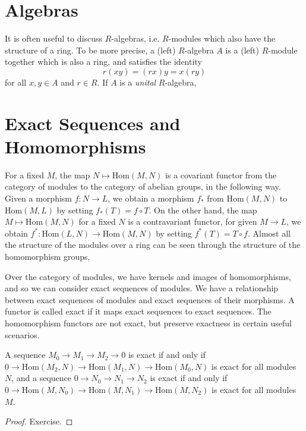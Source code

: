 \section{Algebras}

It is often useful to discuss $R$-algebras, i.e. $R$-modules which also have the structure of a ring. To be more precise, a (left) $R$-algebra $A$ is a (left) $R$-module together which is also a ring, and satisfies the identity
%
\[ r(xy) = (rx) y = x(ry) \]
%
for all $x,y \in A$ and $r \in R$. If $A$ is a \emph{unital} $R$-algebra, 

\section{Exact Sequences and Homomorphisms}

For a fixed $M$, the map $N \mapsto \text{Hom}(M,N)$ is a covariant functor from the category of modules to the category of abelian groups, in the following way. Given a morphism $f: N \to L$, we obtain a morphism $f_*$ from $\text{Hom}(M,N)$ to $\text{Hom}(M,L)$ by setting $f_*(T) = f \circ T$. On the other hand, the map $M \mapsto \text{Hom}(M,N)$ for a fixed $N$ is a contravariant functor, for given $M \to L$, we obtain $f^*: \text{Hom}(L,N) \to \text{Hom}(M,N)$ by setting $f^*(T) = T \circ f$. Almost all the structure of the modules over a ring can be seen through the structure of the homomorphism groups, 

Over the category of modules, we have kernels and images of homomorphisms, and so we can consider exact sequences of modules. We have a relationship between exact sequences of modules and exact sequences of their morphisms. A functor is called exact if it maps exact sequences to exact sequences. The homomorphism functors are not exact, but preserve exactness in certain useful scenarios.

\begin{theorem}
    A sequence $M_0 \to M_1 \to M_2 \to 0$ is exact if and only if $0 \to \text{Hom}(M_2,N) \to \text{Hom}(M_1,N) \to \text{Hom}(M_0,N)$ is exact for all modules $N$, and a sequence $0 \to N_0 \to N_1 \to N_2$ is exact if and only if $0 \to \text{Hom}(M,N_0) \to \text{Hom}(M,N_1) \to \text{Hom}(M,N_2)$ is exact for all modules $M$.
\end{theorem}
\begin{proof}
    Exercise.
\end{proof}


